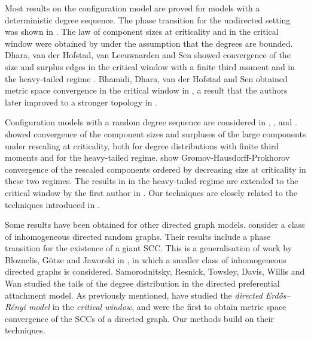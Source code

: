 Most results on the configuration model are proved for models with a deterministic degree sequence. The phase transition for the undirected setting was shown in \cite{molloyCriticalPointRandom1995, molloySizeGiantComponent1998, jansonNewApproachGiant2009}. The law of component sizes at criticality and in the critical window were obtained by \citet{riordanPhaseTransitionConfiguration2012} under the assumption that the degrees are bounded. Dhara, van der Hofstad, van Leeuwaarden and Sen showed convergence of the size and surplus edges in the critical window with a finite third moment \cite{dharaCriticalWindowConfiguration2017} and in the heavy-tailed regime \cite{dharaHeavytailedConfigurationModels2020}.  Bhamidi, Dhara, van der Hofstad and Sen obtained metric space convergence in the critical window in \cite{bhamidiUniversalityCriticalHeavytailed2020}, a result that the authors later improved to a stronger topology in \cite{bhamidiGlobalLowerMassbound2020}.

Configuration models with a random degree sequence are considered in \cite{josephComponentSizesCritical2014}, \cite{conchon--kerjanStableGraphMetric2021}, and \cite{Donderwinkel2021heightprocess}. \citet{josephComponentSizesCritical2014} showed convergence of the component sizes and surpluses of the large components under rescaling at criticality, both for degree distributions with finite third moments and for the heavy-tailed regime. \citet{conchon--kerjanStableGraphMetric2021} show Gromov-Hausdorff-Prokhorov convergence of the rescaled components ordered by decreasing size at criticality in these two regimes. The results in \cite{conchon--kerjanStableGraphMetric2021} in the heavy-tailed regime are extended to the critical window by the first author in \cite{Donderwinkel2021heightprocess}. Our techniques are closely related to the techniques introduced in \cite{conchon--kerjanStableGraphMetric2021}. 

Some results have been obtained for other directed graph models. \citet{caoConnectivityGeneralClass2019} consider a class of inhomogeneous directed random graphs. Their results include a phase transition for the existence of a giant SCC. This is a generalisation of work by Bloznelis, Götze and Jaworski in \cite{bloznelisBirthStronglyConnected2012}, in which a smaller class of inhomogeneous directed graphs is considered. Samorodnitsky, Resnick, Towsley, Davis, Willis and Wan \cite{samorodnitskyNonstandardRegularVariation2016} studied the tails of the degree distribution in the directed preferential attachment model. As previously mentioned, \citet{goldschmidtScalingLimitCritical2021} have studied the \emph{directed Erdős--Rényi model} in the \emph{critical window}, and were the first to obtain metric space convergence of the SCCs of a directed graph. Our methods build on their techniques. 

